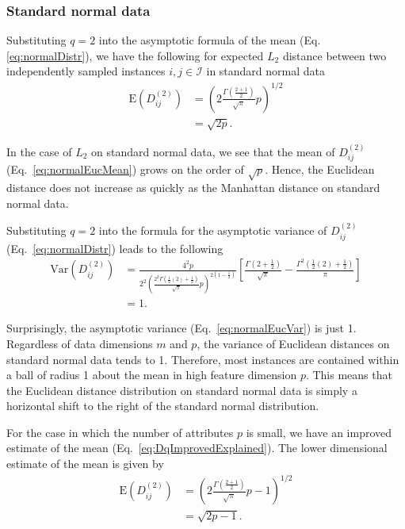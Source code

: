 \documentclass[aoas]{imsart}
\begin{document}
\subsubsection{Standard normal data}

Substituting $q=2$ into the asymptotic formula of the mean (Eq. \ref{eq:normalDistr}), we have the following for expected $L_2$ distance between two independently sampled instances $i,j \in \mathcal{I}$ in standard normal data
%
\begin{equation}\label{eq:normalEucMean}
\begin{aligned}
\text{E}\left(D^{(2)}_{ij}\right) &= \left(2\frac{\Gamma\left(\frac{2 + 1}{2}\right)}{\sqrt{\pi}}p\right)^{1/2} \\
&= \sqrt{2p}.
\end{aligned}
\end{equation}

In the case of $L_2$ on standard normal data, we see that the mean of $D^{(2)}_{ij}$ (Eq.~\ref{eq:normalEucMean}) grows on the order of $\sqrt{p}$. Hence, the Euclidean distance does not increase as quickly as the Manhattan distance on standard normal data.

Substituting $q=2$ into the formula for the asymptotic variance of $D^{(2)}_{ij}$ (Eq.~\ref{eq:normalDistr}) leads to the following
%
\begin{equation}\label{eq:normalEucVar}
\begin{aligned}
\text{Var}\left(D^{(2)}_{ij}\right) &= \frac{4^2p}{2^2\left(\frac{2^2\Gamma\left(\frac{1}{2}(2) + \frac{1}{2}\right)}{\sqrt{\pi}}p\right)^{2\left(1 - \frac{1}{2}\right)}}\left[\frac{\Gamma\left(2 + \frac{1}{2}\right)}{\sqrt{\pi}} - \frac{\Gamma^2\left(\frac{1}{2}(2) + \frac{1}{2}\right)}{\pi}\right] \\
&= 1.
\end{aligned}
\end{equation}

Surprisingly, the asymptotic variance (Eq.~\ref{eq:normalEucVar}) is just 1. Regardless of data dimensions $m$ and $p$, the variance of Euclidean distances on standard normal data tends to 1. Therefore, most instances are contained within a ball of radius 1 about the mean in high feature dimension $p$. This means that the Euclidean distance distribution on standard normal data is simply a horizontal shift to the right of the standard normal distribution.

For the case in which the number of attributes $p$ is small, we have an improved estimate of the mean (Eq.~\ref{eq:DqImprovedExplained}). The lower dimensional estimate of the mean is given by
%
\begin{equation}\label{eq:normalEucMeanImproved}
\begin{aligned}
\text{E}\left(D^{(2)}_{ij}\right) &= \left(2\frac{\Gamma\left(\frac{2 + 1}{2}\right)}{\sqrt{\pi}}p - 1\right)^{1/2} \\
&= \sqrt{2p - 1}.
\end{aligned}
\end{equation}
\end{document}
